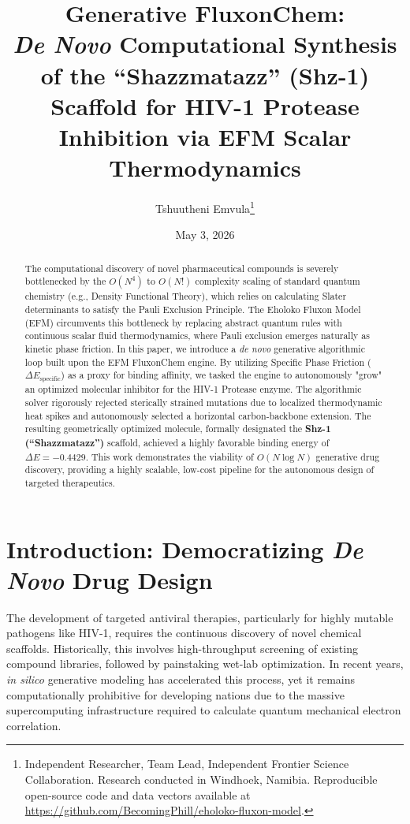 \documentclass[11pt, twoside]{article}
\title{Generative FluxonChem: \\ \Large \textit{De Novo} Computational Synthesis of the ``Shazzmatazz'' (Shz-1) Scaffold for HIV-1 Protease Inhibition via EFM Scalar Thermodynamics}
\author{Tshuutheni Emvula\thanks{Independent Researcher, Team Lead, Independent Frontier Science Collaboration. Research conducted in Windhoek, Namibia. Reproducible open-source code and data vectors available at \url{https://github.com/BecomingPhill/eholoko-fluxon-model}.}}
\date{May 3, 2026}
\begin{document}
\maketitle
\thispagestyle{empty}

\begin{abstract}
The computational discovery of novel pharmaceutical compounds is severely bottlenecked by the $O(N^4)$ to $O(N!)$ complexity scaling of standard quantum chemistry (e.g., Density Functional Theory), which relies on calculating Slater determinants to satisfy the Pauli Exclusion Principle. The Eholoko Fluxon Model (EFM) circumvents this bottleneck by replacing abstract quantum rules with continuous scalar fluid thermodynamics, where Pauli exclusion emerges naturally as kinetic phase friction. In this paper, we introduce a \textit{de novo} generative algorithmic loop built upon the EFM FluxonChem engine. By utilizing Specific Phase Friction ($\Delta E_{\text{specific}}$) as a proxy for binding affinity, we tasked the engine to autonomously "grow" an optimized molecular inhibitor for the HIV-1 Protease enzyme. The algorithmic solver rigorously rejected sterically strained mutations due to localized thermodynamic heat spikes and autonomously selected a horizontal carbon-backbone extension. The resulting geometrically optimized molecule, formally designated the \textbf{Shz-1 (``Shazzmatazz'')} scaffold, achieved a highly favorable binding energy of $\Delta E = -0.4429$. This work demonstrates the viability of $O(N \log N)$ generative drug discovery, providing a highly scalable, low-cost pipeline for the autonomous design of targeted therapeutics.
\end{abstract}

\clearpage
\tableofcontents
\clearpage

\section{Introduction: Democratizing \textit{De Novo} Drug Design}

The development of targeted antiviral therapies, particularly for highly mutable pathogens like HIV-1, requires the continuous discovery of novel chemical scaffolds. Historically, this involves high-throughput screening of existing compound libraries, followed by painstaking wet-lab optimization. In recent years, \textit{in silico} generative modeling has accelerated this process, yet it remains computationally prohibitive for developing nations due to the massive supercomputing infrastructure required to calculate quantum mechanical electron correlation.
\end{document}
